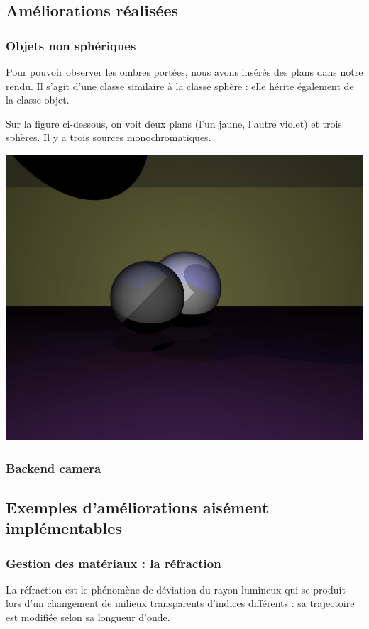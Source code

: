 \documentclass{article}
\begin{document}
\subsection{Améliorations réalisées}
\subsubsection{Objets non sphériques}
Pour pouvoir observer les ombres portées, nous avons insérés des plans dans
notre rendu. Il s'agit d'une classe similaire à la classe sphère : elle hérite
également de la classe objet.

Sur la figure ci-dessous, on voit deux plans (l'un jaune, l'autre violet) et
trois sphères. Il y a trois sources monochromatiques.

\begin{center}
  \includegraphics[scale=0.2]{img/screenshot.png}
\end{center}


\subsubsection{Backend camera}

\subsection{Exemples d'améliorations aisément implémentables}
\subsubsection{Gestion des matériaux : la réfraction}
La réfraction est le phénomène de déviation du rayon lumineux qui se produit
lors d’un changement de milieux transparents d’indices différents : sa
trajectoire est modifiée selon sa longueur d'onde.
\end{document}
